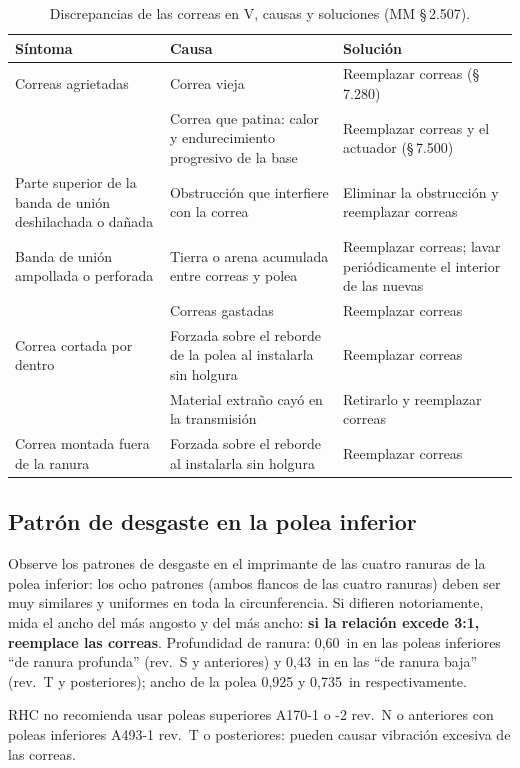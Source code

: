 \begin{table}[htbp]
\centering\small
\caption{Discrepancias de las correas en V, causas y soluciones (MM \S\,2.507).}
\begin{tabularx}{\linewidth}{@{}L{2.2cm}YY@{}}
\toprule
Síntoma & Causa & Solución \\
\midrule
Correas agrietadas & Correa vieja & Reemplazar correas (\S\,7.280) \\
 & Correa que patina: calor y endurecimiento progresivo de la base & Reemplazar correas y el actuador (\S\,7.500) \\
Parte superior de la banda de unión deshilachada o dañada & Obstrucción que interfiere con la correa & Eliminar la obstrucción y reemplazar correas \\
Banda de unión ampollada o perforada & Tierra o arena acumulada entre correas y polea & Reemplazar correas; lavar periódicamente el interior de las nuevas \\
 & Correas gastadas & Reemplazar correas \\
Correa cortada por dentro & Forzada sobre el reborde de la polea al instalarla sin holgura & Reemplazar correas \\
 & Material extraño cayó en la transmisión & Retirarlo y reemplazar correas \\
Correa montada fuera de la ranura & Forzada sobre el reborde al instalarla sin holgura & Reemplazar correas \\
\bottomrule
\end{tabularx}
\end{table}

\subsection{Patrón de desgaste en la polea inferior}

Observe los patrones de desgaste en el imprimante de las cuatro ranuras de la polea inferior: los ocho patrones (ambos flancos de las cuatro ranuras) deben ser muy similares y uniformes en toda la circunferencia. Si difieren notoriamente, mida el ancho del más angosto y del más ancho: \textbf{si la relación excede 3:1, reemplace las correas}. Profundidad de ranura: 0,60~in en las poleas inferiores ``de ranura profunda'' (rev.~S y anteriores) y 0,43~in en las ``de ranura baja'' (rev.~T y posteriores); ancho de la polea 0,925 y 0,735~in respectivamente.

\begin{precaucion}
RHC no recomienda usar poleas superiores A170-1 o -2 rev.~N o anteriores con poleas inferiores A493-1 rev.~T o posteriores: pueden causar vibración excesiva de las correas.
\end{precaucion}

